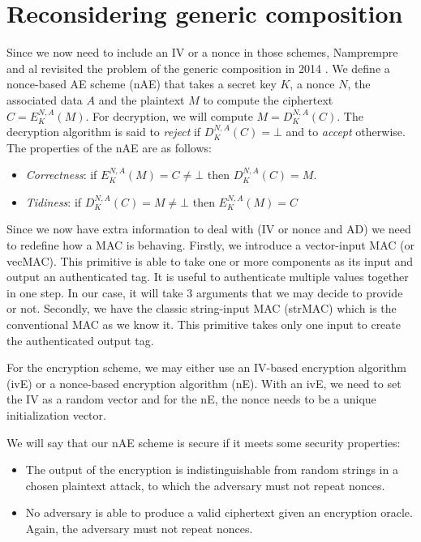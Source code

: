 \documentclass[10pt,a4paper]{article}
\begin{document}
\section{Reconsidering generic composition}
Since we now need to include an IV or a nonce in those schemes, Namprempre and al revisited the problem of the generic composition in 2014 \cite{namprempre2014reconsidering}.
We define a nonce-based AE scheme (nAE) that takes a secret key $K$, a nonce $N$, the associated data $A$ and the plaintext $M$ to compute the ciphertext $C = E^{N,A}_K(M)$.
For decryption, we will compute $M = D^{N,A}_K(C)$.
The decryption algorithm is said to \emph{reject} if $D^{N,A}_K(C) = \bot$ and to \emph{accept} otherwise.
The properties of the nAE are as follows:
\begin{itemize}
	\item \emph{Correctness}: if $E^{N,A}_K(M) = C \not= \bot$ then $D^{N,A}_K(C) = M$.
	\item \emph{Tidiness}: if $D^{N,A}_K(C) = M \not= \bot$ then $E^{N,A}_K(M) = C$
\end{itemize}

Since we now have extra information to deal with (IV or nonce and AD) we need to redefine how a MAC is behaving.
Firstly, we introduce a vector-input MAC (or vecMAC).
This primitive is able to take one or more components as its input and output an authenticated tag.
It is useful to authenticate multiple values together in one step.
In our case, it will take 3 arguments that we may decide to provide or not.
Secondly, we have the classic string-input MAC (strMAC) which is the conventional MAC as we know it.
This primitive takes only one input to create the authenticated output tag.

For the encryption scheme, we may either use an IV-based encryption algorithm (ivE) or a nonce-based encryption algorithm (nE).
With an ivE, we need to set the IV as a random vector and for the nE, the nonce needs to be a unique initialization vector.

We will say that our nAE scheme is secure if it meets some security properties:
\begin{itemize}
\item The output of the encryption is indistinguishable from random strings in a chosen plaintext attack, to which the adversary must not repeat nonces.
\item No adversary is able to produce a valid ciphertext given an encryption oracle. Again, the adversary must not repeat nonces.
\end{itemize}
\end{document}
